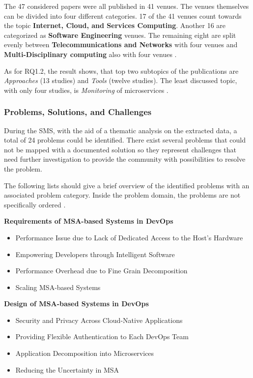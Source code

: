 The 47 considered papers were all published in 41 venues. The venues
themselves can be divided into four different categories. 17 of the 41
venues count towards the topic \textbf{Internet, Cloud, and Services Computing}.
Another 16 are categorized as \textbf{Software Engineering} venues. The remaining
eight are split evenly between \textbf{Telecommunications and Networks} with four venues
and \textbf{Multi-Disciplinary computing} also with four venues \cite{waseem:SMSMSADevOps}.

As for RQ1.2, the result shows, that top two subtopics of the publications
are \textit{Approaches} (13 studies) and \textit{Tools} (twelve studies).
The least discussed topic, with only four studies, is \textit{Monitoring}
of microservices \cite{waseem:SMSMSADevOps}.

\subsubsection{Problems, Solutions, and Challenges}

During the SMS, with the aid of a thematic analysis on the
extracted data, a total of 24 problems could be identified.
There exist several problems that could not be mapped with a documented
solution so they represent challenges that need further investigation
to provide the community with possibilities to resolve the problem.

The following lists should give a brief overview of the identified
problems with an associated problem category. Inside the problem domain,
the problems are not specifically ordered \cite{waseem:SMSMSADevOps}.

\textbf{Requirements of MSA-based Systems in DevOps}
\begin{itemize}
    \item Performance Issue due to Lack of Dedicated Access
    to the Host's Hardware
    \item Empowering Developers through Intelligent Software
    \item Performance Overhead due to Fine Grain Decomposition
    \item Scaling MSA-based Systems
\end{itemize}

\textbf{Design of MSA-based Systems in DevOps}
\begin{itemize}
    \item Security and Privacy Across Cloud-Native Applications
    \item Providing Flexible Authentication to Each DevOps Team
    \item Application Decomposition into Microservices
    \item Reducing the Uncertainty in MSA
\end{itemize}

